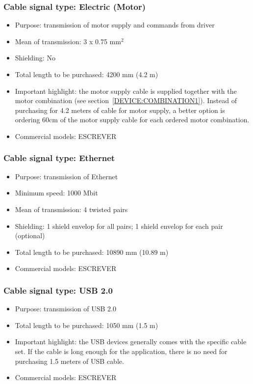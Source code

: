 \subsubsection{Cable signal type: Electric (Motor)} \label{CABLETYPE:Electric(Motor)}
\begin{itemize}
  \item Purpose: transmission of motor supply and commands from driver
  \item Mean of transmission: 3 x 0.75 mm$^{2}$
  \item Shielding: No
  \item Total length to be purchased: 4200 mm (4.2 m)
  \item Important highlight: the motor supply cable is supplied together with the motor combination (see section~\ref{DEVICE:COMBINATION1}). Instead of purchasing for 4.2 meters of cable for motor supply, a better option is ordering 60cm of the motor supply cable for each ordered motor combination.
  \item Commercial models: ESCREVER
\end{itemize}
\subsubsection{Cable signal type: Ethernet} \label{CABLETYPE:Ethernet}
\begin{itemize}
  \item Purpose: transmission of Ethernet
  \item Minimum speed: 1000 Mbit
  \item Mean of transmission: 4 twisted pairs
  \item Shielding: 1 shield envelop for all pairs; 1 shield envelop for each pair (optional)
  \item Total length to be purchased: 10890 mm (10.89 m)
  \item Commercial models: ESCREVER
\end{itemize}
\subsubsection{Cable signal type: USB 2.0} \label{CABLETYPE:USB20}
\begin{itemize}
  \item Purpose: transmission of USB 2.0
  \item Total length to be purchased: 1050 mm (1.5 m)
  \item Important highlight: the USB devices generally comes with the specific cable set. If the cable is long enough for the application, there is no need for purchasing 1.5 meters of USB cable.
  \item Commercial models: ESCREVER
\end{itemize}
